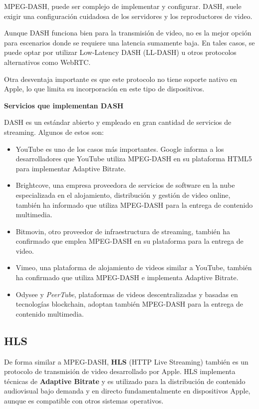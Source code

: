 MPEG-DASH, puede ser complejo de implementar y configurar. DASH, suele exigir una configuración cuidadosa de los servidores y los reproductores de video. 

Aunque DASH funciona bien para la transmisión de video, no es la mejor opción para escenarios donde se requiere una latencia sumamente baja. En tales casos, se puede optar por utilizar Low-Latency DASH (LL-DASH) u otros protocolos alternativos como WebRTC. 

Otra desventaja importante es que este protocolo no tiene soporte nativo en Apple, lo que limita su incorporación en este tipo de dispositivos. 


\textbf{Servicios que implementan DASH}

DASH es un estándar abierto y empleado en gran cantidad de servicios de streaming. Algunos de estos son:

\begin{itemize}
    \item YouTube es uno de los casos más importantes. Google informa a los desarrolladores que YouTube utiliza MPEG-DASH en su plataforma HTML5 para implementar Adaptive Bitrate. 
    \item Brightcove, una empresa proveedora de servicios de software en la nube especializada en el alojamiento, distribución y gestión de video online, también ha informado que utiliza MPEG-DASH para la entrega de contenido multimedia.
    \item Bitmovin, otro proveedor de infraestructura de streaming, también ha confirmado que emplea MPEG-DASH en su plataforma para la entrega de video.
    \item Vimeo, una plataforma de alojamiento de videos similar a YouTube, también ha confirmado que utiliza MPEG-DASH e implementa Adaptive Bitrate.
    \item Odysee y \textit{PeerTube}, plataformas de videos descentralizadas y basadas en tecnologías blockchain, adoptan también MPEG-DASH para la entrega de contenido multimedia.
\end{itemize}

\subsection{HLS}

De forma similar a MPEG-DASH, \textbf{HLS} \cite{hls} (HTTP Live Streaming) también es un protocolo de transmisión de video desarrollado por Apple. HLS implementa técnicas de \textbf{Adaptive Bitrate} y es utilizado para la distribución de contenido audiovisual bajo demanda y en directo fundamentalmente en dispositivos Apple, aunque es compatible con otros sistemas operativos. 

